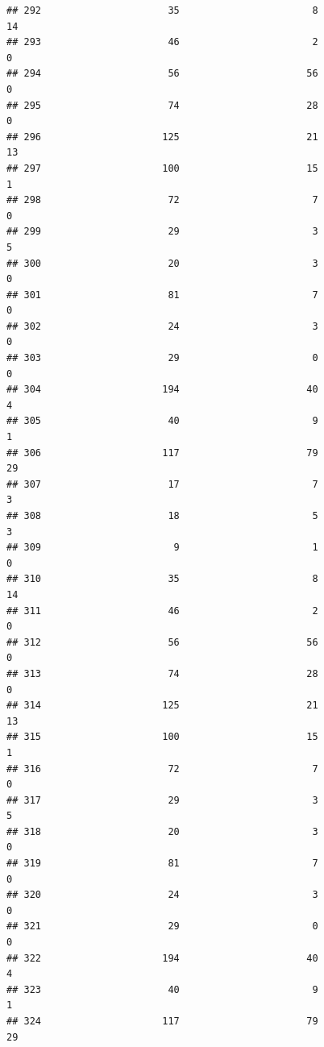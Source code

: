 \documentclass[
]{article}
\begin{document}
\begin{verbatim}
## 292                      35                       8                       14
## 293                      46                       2                        0
## 294                      56                      56                        0
## 295                      74                      28                        0
## 296                     125                      21                       13
## 297                     100                      15                        1
## 298                      72                       7                        0
## 299                      29                       3                        5
## 300                      20                       3                        0
## 301                      81                       7                        0
## 302                      24                       3                        0
## 303                      29                       0                        0
## 304                     194                      40                        4
## 305                      40                       9                        1
## 306                     117                      79                       29
## 307                      17                       7                        3
## 308                      18                       5                        3
## 309                       9                       1                        0
## 310                      35                       8                       14
## 311                      46                       2                        0
## 312                      56                      56                        0
## 313                      74                      28                        0
## 314                     125                      21                       13
## 315                     100                      15                        1
## 316                      72                       7                        0
## 317                      29                       3                        5
## 318                      20                       3                        0
## 319                      81                       7                        0
## 320                      24                       3                        0
## 321                      29                       0                        0
## 322                     194                      40                        4
## 323                      40                       9                        1
## 324                     117                      79                       29

\end{verbatim}
\end{document}
